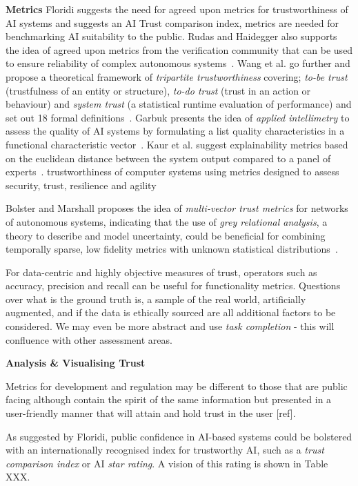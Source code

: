 \noindent\textbf{Metrics}
Floridi suggests the need for agreed upon metrics for trustworthiness of AI systems and suggests an  AI Trust comparison index, metrics are needed for benchmarking AI suitability to the public. 
%
Rudas and Haidegger also supports the idea of agreed upon metrics from the verification community that can be used to ensure reliability of complex autonomous systems~\cite{Rudas2020}. Wang et al. go further and propose a  theoretical framework of \emph{tripartite trustworthiness} covering; \emph{to-be trust} (trustfulness of an entity or structure), \emph{to-do trust} (trust in an action or behaviour) and \emph{system trust} (a statistical runtime evaluation of performance) and set out 18 formal definitions~\cite{Wang2020}. 
%
Garbuk presents the idea of \emph{applied intellimetry} to assess the quality of AI systems by formulating a list quality characteristics in a functional characteristic vector~\cite{garbuk2018intellimetry}. 
%
Kaur et al. suggest explainability metrics based on the euclidean distance between the system output compared to a panel of experts~\cite{kaur2021trustworthy}. 
%
trustworthiness of computer systems using metrics designed to assess security, trust, resilience and agility~\cite{cho2019stram}

Bolster and Marshall proposes the idea of \emph{multi-vector trust metrics} for networks of autonomous systems, indicating that the use of \emph{grey relational analysis}, a theory to describe and model uncertainty, could be beneficial for combining temporally sparse, low fidelity metrics with unknown statistical distributions~\cite{Bolster2014}. 

For data-centric and highly objective measures of trust, operators such as accuracy, precision and recall can be useful for functionality metrics. Questions over what is the ground truth is, a sample of the real world, artificially augmented, and if the data is ethically sourced are all additional factors to be considered. We may even be more abstract and use \emph{task completion} - this will confluence with other assessment areas.



\noindent\textbf{Analysis \& Visualising Trust}

Metrics for development and regulation may be different to those that are public facing although contain the spirit of the same information but presented in a user-friendly manner that will attain and hold trust in the user [ref].

As suggested by Floridi, public confidence in AI-based systems could be bolstered with an internationally recognised index for trustworthy AI, such as a \emph{trust comparison index} or AI \emph{star rating}. A vision of this rating is shown in Table XXX. 


